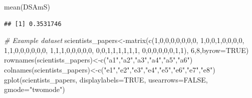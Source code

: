 \documentclass[
  notitlepage,
  onecolumn,
  openany]{book}
\newenvironment{Shaded}{\begin{snugshade}}{\end{snugshade}}
\newcommand{\AttributeTok}[1]{\textcolor[rgb]{0.77,0.63,0.00}{#1}}
\newcommand{\CommentTok}[1]{\textcolor[rgb]{0.56,0.35,0.01}{\textit{#1}}}
\newcommand{\ConstantTok}[1]{\textcolor[rgb]{0.00,0.00,0.00}{#1}}
\newcommand{\DecValTok}[1]{\textcolor[rgb]{0.00,0.00,0.81}{#1}}
\newcommand{\FunctionTok}[1]{\textcolor[rgb]{0.00,0.00,0.00}{#1}}
\newcommand{\NormalTok}[1]{#1}
\newcommand{\OtherTok}[1]{\textcolor[rgb]{0.56,0.35,0.01}{#1}}
\newcommand{\StringTok}[1]{\textcolor[rgb]{0.31,0.60,0.02}{#1}}
\begin{document}
\begin{Shaded}
\begin{Highlighting}[]
\FunctionTok{mean}\NormalTok{(DSAmS)}
\end{Highlighting}
\end{Shaded}

\begin{verbatim}
## [1] 0.3531746
\end{verbatim}

\begin{Shaded}
\begin{Highlighting}[]
\CommentTok{\# Example dataset}
\NormalTok{scientists\_papers}\OtherTok{\textless{}{-}}\FunctionTok{matrix}\NormalTok{(}\FunctionTok{c}\NormalTok{(}\DecValTok{1}\NormalTok{,}\DecValTok{0}\NormalTok{,}\DecValTok{0}\NormalTok{,}\DecValTok{0}\NormalTok{,}\DecValTok{0}\NormalTok{,}\DecValTok{0}\NormalTok{,}\DecValTok{0}\NormalTok{,}\DecValTok{0}\NormalTok{,}
                            \DecValTok{1}\NormalTok{,}\DecValTok{0}\NormalTok{,}\DecValTok{0}\NormalTok{,}\DecValTok{1}\NormalTok{,}\DecValTok{0}\NormalTok{,}\DecValTok{0}\NormalTok{,}\DecValTok{0}\NormalTok{,}\DecValTok{0}\NormalTok{,}
                            \DecValTok{1}\NormalTok{,}\DecValTok{1}\NormalTok{,}\DecValTok{0}\NormalTok{,}\DecValTok{0}\NormalTok{,}\DecValTok{0}\NormalTok{,}\DecValTok{0}\NormalTok{,}\DecValTok{0}\NormalTok{,}\DecValTok{0}\NormalTok{,}
                            \DecValTok{1}\NormalTok{,}\DecValTok{1}\NormalTok{,}\DecValTok{1}\NormalTok{,}\DecValTok{0}\NormalTok{,}\DecValTok{0}\NormalTok{,}\DecValTok{0}\NormalTok{,}\DecValTok{0}\NormalTok{,}\DecValTok{0}\NormalTok{,}
                            \DecValTok{0}\NormalTok{,}\DecValTok{0}\NormalTok{,}\DecValTok{1}\NormalTok{,}\DecValTok{1}\NormalTok{,}\DecValTok{1}\NormalTok{,}\DecValTok{1}\NormalTok{,}\DecValTok{1}\NormalTok{,}\DecValTok{1}\NormalTok{,}
                            \DecValTok{0}\NormalTok{,}\DecValTok{0}\NormalTok{,}\DecValTok{0}\NormalTok{,}\DecValTok{0}\NormalTok{,}\DecValTok{0}\NormalTok{,}\DecValTok{0}\NormalTok{,}\DecValTok{1}\NormalTok{,}\DecValTok{1}\NormalTok{),}
                          \DecValTok{6}\NormalTok{,}\DecValTok{8}\NormalTok{,}\AttributeTok{byrow=}\ConstantTok{TRUE}\NormalTok{)}
\FunctionTok{rownames}\NormalTok{(scientists\_papers)}\OtherTok{\textless{}{-}}\FunctionTok{c}\NormalTok{(}\StringTok{"a1"}\NormalTok{,}\StringTok{"a2"}\NormalTok{,}\StringTok{"a3"}\NormalTok{,}\StringTok{"a4"}\NormalTok{,}\StringTok{"a5"}\NormalTok{,}\StringTok{"a6"}\NormalTok{)}
\FunctionTok{colnames}\NormalTok{(scientists\_papers)}\OtherTok{\textless{}{-}}\FunctionTok{c}\NormalTok{(}\StringTok{"e1"}\NormalTok{,}\StringTok{"e2"}\NormalTok{,}\StringTok{"e3"}\NormalTok{,}\StringTok{"e4"}\NormalTok{,}\StringTok{"e5"}\NormalTok{,}\StringTok{"e6"}\NormalTok{,}\StringTok{"e7"}\NormalTok{,}\StringTok{"e8"}\NormalTok{)}
\FunctionTok{gplot}\NormalTok{(scientists\_papers, }\AttributeTok{displaylabels=}\ConstantTok{TRUE}\NormalTok{, }\AttributeTok{usearrows=}\ConstantTok{FALSE}\NormalTok{, }\AttributeTok{gmode=}\StringTok{"twomode"}\NormalTok{)}
\end{Highlighting}
\end{Shaded}
\end{document}
